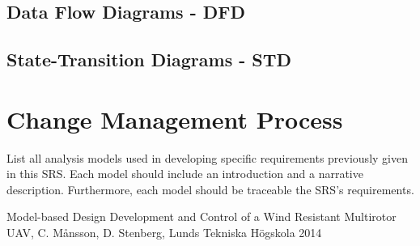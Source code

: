 \documentclass[a4paper]{article}
\begin{document}
\subsection{Data Flow Diagrams - DFD}
\subsection{State-Transition Diagrams - STD}

\section{Change Management Process}
List all analysis models used in developing specific requirements previously given in this SRS.  Each model should include an introduction and a narrative description.  Furthermore, each model should be traceable the SRS’s requirements.




\begin{thebibliography}{99}
 Model-based Design Development and Control of a Wind Resistant Multirotor UAV, C. Månsson, D. Stenberg, Lunds Tekniska Högskola 2014
\end{thebibliography}
\end{document}
